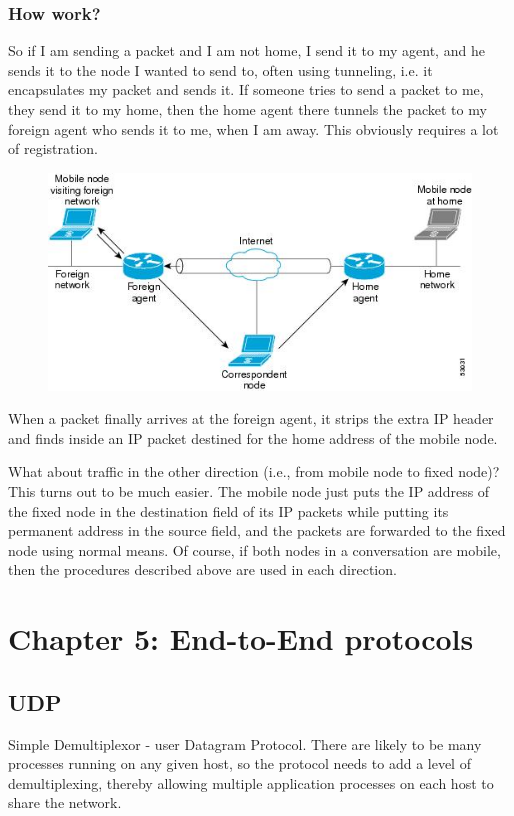 \documentclass[12pt]{book}
\begin{document}
\subsection{How work?}
So if I am sending a packet and I am not home, I send it to my agent, and he sends it to the node I wanted to send to, often using tunneling, i.e. it encapsulates my packet and sends it. If someone tries to send a packet to me, they send it to my home, then the home agent there tunnels the packet to my foreign agent who sends it to me, when I am away. This obviously requires a lot of registration.
\begin{figure}[H]
    \centering
    \includegraphics[width = \textwidth]{Pictures/MobileIPSending.jpg}
\end{figure}
When a packet finally arrives at the foreign agent, it strips the extra IP header and finds inside an IP packet destined for the home address of the mobile node.
\par
What about traffic in the other direction (i.e., from mobile node to fixed node)? This turns out to be much easier. The mobile node just puts the IP address of the fixed node in the destination field of its IP packets while putting its permanent address in the source field, and the packets are forwarded to the fixed node using normal means. Of course, if both nodes in a conversation are mobile, then the procedures described above are used in each direction.

\chapter{Chapter 5: End-to-End protocols}

\section{UDP}
Simple Demultiplexor - user Datagram Protocol. There are likely to be many processes running on any given host, so the protocol needs to add a level of demultiplexing, thereby allowing multiple application processes on each host to share the network.
\end{document}
